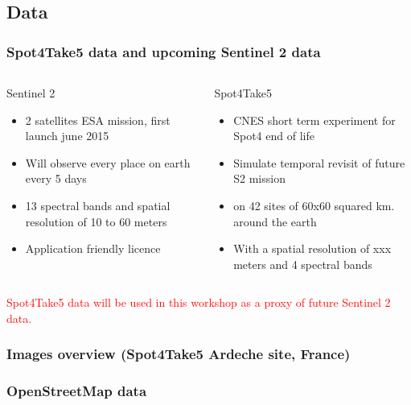 \documentclass[8pt]{beamer}
\begin{document}
\subsection{Data}
\begin{frame}
\frametitle{Spot4Take5 data and upcoming Sentinel 2 data}

\begin{columns}[t]
\begin{column}{5cm}
\begin{block}{Sentinel 2}
\begin{itemize}
\item 2 satellites ESA mission, first launch june 2015
\item Will observe every place on earth every 5 days
\item 13 spectral bands and spatial resolution of 10 to 60 meters
\item Application friendly licence
\end{itemize}
\end{block}
\end{column}
\begin{column}{5cm}
\begin{block}{Spot4Take5}
\begin{itemize}
\item CNES short term experiment for Spot4 end of life
\item Simulate temporal revisit of future S2 mission
\item on 42 sites of 60x60 squared km. around the earth
\item With a spatial resolution of xxx meters and 4 spectral bands
\end{itemize}
\end{block}
\end{column}
\end{columns}

\textcolor{red}{Spot4Take5 data will be used in this workshop as a proxy of future Sentinel 2 data.}

\end{frame}



\begin{frame}
\frametitle{Images overview (Spot4Take5 Ardeche site, France)}

\end{frame}

\begin{frame}
\frametitle{OpenStreetMap data}
\end{frame}
\end{document}
